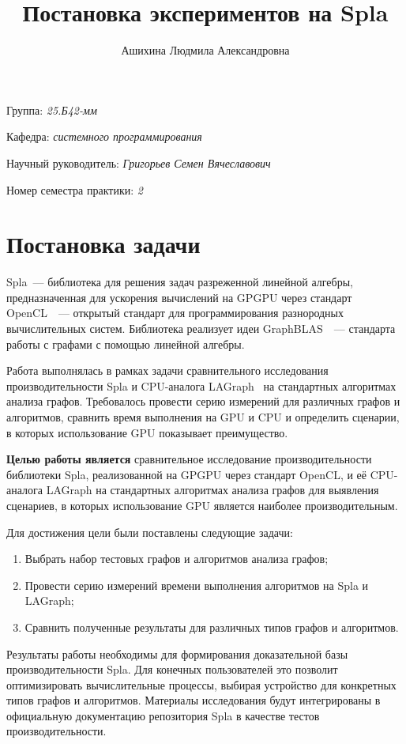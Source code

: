 \documentclass[a4paper]{article}
\title{Постановка экспериментов на Spla}
\author{Ашихина Людмила Александровна}
\date{}
\begin{document}
	
	\maketitle
	
	\begin{flushright}
		Группа: \emph{25.Б42-мм}
		
		Кафедра: \emph{системного программирования}
		
		Научный руководитель: \emph{Григорьев Семен Вячеславович}
		
		Номер семестра практики: \emph{2}
	\end{flushright} 
	
\section{Постановка задачи}

Spla~--- \cite{spla}  библиотека для решения задач разреженной линейной алгебры, предназначенная для ускорения вычислений на GPGPU через стандарт OpenCL~\cite{OpenCl}~--- открытый стандарт для программирования разнородных вычислительных систем. Библиотека реализует идеи GraphBLAS~\cite{GraphBlas}~--- стандарта работы с графами с помощью линейной алгебры.
	
Работа выполнялась в рамках задачи сравнительного исследования производительности Spla и CPU-аналога LAGraph~\cite{LAGraph}  на стандартных алгоритмах анализа графов. Требовалось провести серию измерений для различных графов и алгоритмов, сравнить время выполнения на GPU и CPU и определить сценарии, в которых использование GPU показывает преимущество.
	
\textbf{Целью работы является} сравнительное исследование производительности библиотеки Spla, реализованной на GPGPU через стандарт OpenCL, и её CPU-аналога LAGraph на стандартных алгоритмах анализа графов для выявления сценариев, в которых использование GPU является наиболее производительным.
	
Для достижения цели были поставлены следующие задачи:
\begin{enumerate}
\item Выбрать набор тестовых графов и алгоритмов анализа графов;
\item Провести серию измерений времени выполнения алгоритмов на Spla и LAGraph;
\item Сравнить полученные результаты для различных типов графов и алгоритмов.
\end{enumerate}
	
Результаты работы необходимы для формирования доказательной базы производительности Spla. Для конечных пользователей это позволит оптимизировать вычислительные процессы, выбирая устройство для конкретных типов графов и алгоритмов. Материалы исследования будут интегрированы в официальную документацию репозитория Spla в качестве тестов производительности.
\end{document}
